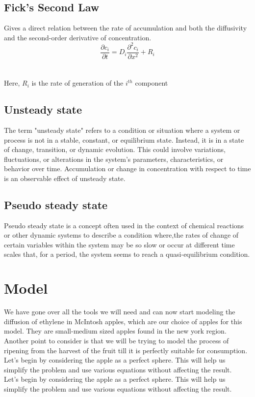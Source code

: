 \documentclass[10pt, a4paper]{article}
\begin{document}
\subsection{Fick’s Second Law}
Gives a direct relation between the rate of accumulation and both the diffusivity and the second-order derivative of concentration.\\

\begin{equation}
    \frac{\partial c_{i}}{\partial t} = D_{i} \frac{\partial^{2} c_{i}}{\partial x^2} + R_{i}
\end{equation}\\
\\
Here, $R_{i}$ is the rate of generation of the $i^{th}$ component\\

\subsection{Unsteady state}
The term "unsteady state" refers to a condition or situation where a system or process is not in a stable, constant, or equilibrium state. Instead, it is in a state of change, transition, or dynamic evolution. This could involve variations, fluctuations, or alterations in the system's parameters, characteristics, or behavior over time.  Accumulation or change in concentration with respect to time is an observable effect of  unsteady state.

\subsection{Pseudo steady state}
Pseudo steady state is a concept often used in the context of chemical reactions or other dynamic systems to describe a condition where,the rates of change of certain variables within the system may be so slow or occur at different time scales that, for a period, the system seems to reach a quasi-equilibrium condition. 


\section{Model}
We have gone over all the tools we will need and can now start modeling the diffusion of ethylene in  McIntosh apples, which are our choice of apples for this model. They are small-medium sized apples found in the new york region.\\
Another point to consider is that we will be trying to model the process of ripening from the harvest of the fruit till it is perfectly suitable for consumption.\\  
Let’s begin by considering the apple as a perfect sphere. This will help us simplify the problem and use various equations without affecting the result. \\
Let’s begin by considering the apple as a perfect sphere. This will help us simplify the problem and use various equations without affecting the result. \\
\end{document}
